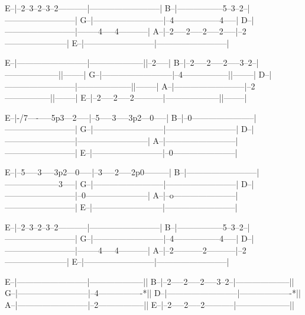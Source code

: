 \begin{lsttab}
E--|--2--3--2--3--2-----------|--------------------------|
B--|-----------------5--3--2--|--------------------------|
G--|--------------------------|--4-----------------4-----|
D--|--------------------------|--------4-----4-----------|
A--|--2-----2-----2-----2-----|--2-----------------------|
E--|--------------------------|--------------------------|

E--|--------------------------|--------------------||--2-----|
B--|--2-----2-----2-----3--2--|--------------------||--------|
G--|--------------------------|--4-----------------||--------|
D--|--------------------------|--------------------||--------|
A--|--------------------------|--2-----------------||--------|
E--|--2-----2-----2-----------|--------------------||--------|








E--|-/7----\5-----5p3---2-----|--5-----3-----3p2---0-----|
B--|--0-----------------------|--------------------------|
G--|--------------------------|--------------------------|
D--|--------------------------|--------------------------|
A--|--------------------------|--------------------------|
E--|--------------------------|--0-----------------------|

E--|--5-----3-----3p2---0-----|--3-----2-----2p0---------|
B--|--------------------------|--------------------3-----|
G--|--------------------------|--------------------------|
D--|--------------------------|--0-----------------------|
A--|--o-----------------------|--------------------------|
E--|--------------------------|--------------------------|

E--|--2--3--2--3--2-----------|--------------------------|
B--|-----------------5--3--2--|--------------------------|
G--|--------------------------|--4-----------------4-----|
D--|--------------------------|--------4-----4-----------|
A--|--2-----------2-----------|--2-----------------------|
E--|--------------------------|--------------------------|

E--|--------------------------|--------------------||
B--|--2-----2-----2-----3--2--|--------------------||
G--|--------------------------|--4----------------*||
D--|--------------------------|-------------------*||
A--|--------------------------|--2-----------------||
E--|--2-----2-----2-----------|--------------------||
\end{lsttab}
\newpage

